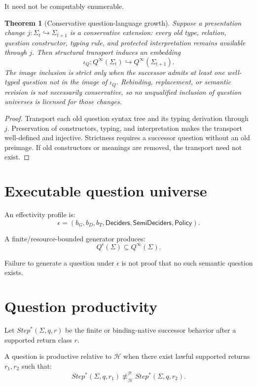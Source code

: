\documentclass[11pt,oneside]{article}
\newtheorem{theorem}[definition]{Theorem}
\begin{document}
It need not be computably enumerable.

\begin{theorem}[Conservative question-language growth]\label{thm:conservative-question-growth}
Suppose a presentation change \(j:\Sigma_t\hookrightarrow\Sigma_{t+1}\) is a
conservative extension: every old type, relation, question constructor, typing rule,
and protected interpretation remains available through \(j\).  Then structural
transport induces an embedding
\[
\boxed{
\iota_Q:Q^\infty(\Sigma_t)\hookrightarrow Q^\infty(\Sigma_{t+1}).
}
\]
The image inclusion is strict only when the successor admits at least one well-typed
question not in the image of \(\iota_Q\).  Rebinding, replacement, or semantic revision
is not necessarily conservative, so no unqualified inclusion of question universes is
licensed for those changes.
\end{theorem}

\begin{proof}
Transport each old question syntax tree and its typing derivation through \(j\).
Preservation of constructors, typing, and interpretation makes the transport
well-defined and injective.  Strictness requires a successor question without an old
preimage.  If old constructors or meanings are removed, the transport need not exist.
\end{proof}

\section{Executable question universe}

An effectivity profile is:
\[
\boxed{
\epsilon=
(
b_G,b_D,b_T,
\mathsf{Deciders},
\mathsf{SemiDeciders},
\mathsf{Policy}
).
}
\]

A finite/resource-bounded generator produces:
\[
Q^\epsilon(\Sigma)\subseteq Q^\infty(\Sigma).
\]

Failure to generate a question under \(\epsilon\) is not proof that no such semantic question exists.

\section{Question productivity}

Let \(Step^\ast(\Sigma,q,r)\) be the finite or binding-native successor behavior after a supported return class \(r\).

A question is productive relative to \(\mathcal H\) when there exist lawful supported returns \(r_1,r_2\) such that:
\[
\boxed{
Step^\ast(\Sigma,q,r_1)
\not\equiv_{\mathcal H}^{\mathcal P}
Step^\ast(\Sigma,q,r_2).
}
\]
\end{document}
